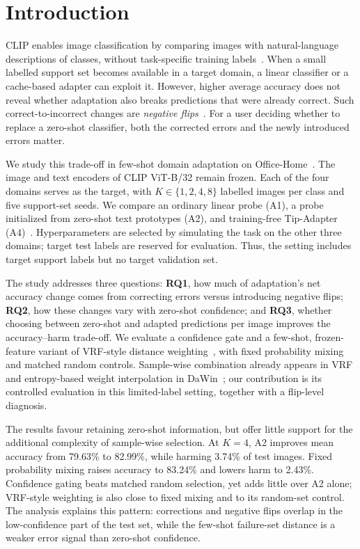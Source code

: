 \section{Introduction}
\label{sec:introduction}
CLIP enables image classification by comparing images with natural-language descriptions of classes, without task-specific training labels~\citep{radford2021clip}. When a small labelled support set becomes available in a target domain, a linear classifier or a cache-based adapter can exploit it. However, higher average accuracy does not reveal whether adaptation also breaks predictions that were already correct. Such correct-to-incorrect changes are \emph{negative flips}~\citep{yan2021flips}. For a user deciding whether to replace a zero-shot classifier, both the corrected errors and the newly introduced errors matter.

We study this trade-off in few-shot domain adaptation on Office-Home~\citep{venkateswara2017officehome}. The image and text encoders of CLIP ViT-B/32 remain frozen. Each of the four domains serves as the target, with $K\in\{1,2,4,8\}$ labelled images per class and five support-set seeds. We compare an ordinary linear probe (A1), a probe initialized from zero-shot text prototypes (A2), and training-free Tip-Adapter (A4)~\citep{zhang2022tip}. Hyperparameters are selected by simulating the task on the other three domains; target test labels are reserved for evaluation. Thus, the setting includes target support labels but no target validation set.

The study addresses three questions: \textbf{RQ1}, how much of adaptation's net accuracy change comes from correcting errors versus introducing negative flips; \textbf{RQ2}, how these changes vary with zero-shot confidence; and \textbf{RQ3}, whether choosing between zero-shot and adapted predictions per image improves the accuracy--harm trade-off. We evaluate a confidence gate and a few-shot, frozen-feature variant of VRF-style distance weighting~\citep{zhu2024vrf}, with fixed probability mixing and matched random controls. Sample-wise combination already appears in VRF and entropy-based weight interpolation in DaWin~\citep{oh2025dawin}; our contribution is its controlled evaluation in this limited-label setting, together with a flip-level diagnosis.

The results favour retaining zero-shot information, but offer little support for the additional complexity of sample-wise selection. At $K=4$, A2 improves mean accuracy from 79.63\% to 82.99\%, while harming 3.74\% of test images. Fixed probability mixing raises accuracy to 83.24\% and lowers harm to 2.43\%. Confidence gating beats matched random selection, yet adds little over A2 alone; VRF-style weighting is also close to fixed mixing and to its random-set control. The analysis explains this pattern: corrections and negative flips overlap in the low-confidence part of the test set, while the few-shot failure-set distance is a weaker error signal than zero-shot confidence.
